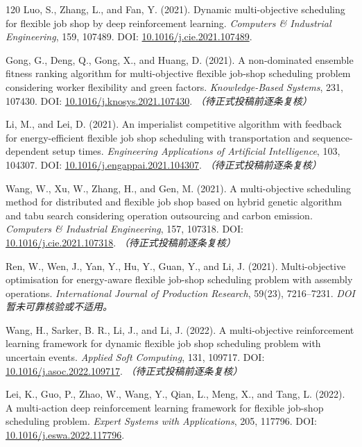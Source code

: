 \documentclass[UTF8,a4paper,11pt]{ctexart}
\begin{document}
\begin{thebibliography}{120}
Luo, S., Zhang, L., and Fan, Y. (2021). Dynamic multi-objective scheduling for flexible job shop by deep reinforcement learning. \emph{Computers \& Industrial Engineering}, 159, 107489.
\newblock DOI: \href{https://doi.org/10.1016/j.cie.2021.107489}{10.1016/j.cie.2021.107489}.

Gong, G., Deng, Q., Gong, X., and Huang, D. (2021). A non-dominated ensemble fitness ranking algorithm for multi-objective flexible job-shop scheduling problem considering worker flexibility and green factors. \emph{Knowledge-Based Systems}, 231, 107430.
\newblock DOI: \href{https://doi.org/10.1016/j.knosys.2021.107430}{10.1016/j.knosys.2021.107430}. \textit{（待正式投稿前逐条复核）}

Li, M., and Lei, D. (2021). An imperialist competitive algorithm with feedback for energy-efficient flexible job shop scheduling with transportation and sequence-dependent setup times. \emph{Engineering Applications of Artificial Intelligence}, 103, 104307.
\newblock DOI: \href{https://doi.org/10.1016/j.engappai.2021.104307}{10.1016/j.engappai.2021.104307}. \textit{（待正式投稿前逐条复核）}

Wang, W., Xu, W., Zhang, H., and Gen, M. (2021). A multi-objective scheduling method for distributed and flexible job shop based on hybrid genetic algorithm and tabu search considering operation outsourcing and carbon emission. \emph{Computers \& Industrial Engineering}, 157, 107318.
\newblock DOI: \href{https://doi.org/10.1016/j.cie.2021.107318}{10.1016/j.cie.2021.107318}. \textit{（待正式投稿前逐条复核）}

Ren, W., Wen, J., Yan, Y., Hu, Y., Guan, Y., and Li, J. (2021). Multi-objective optimisation for energy-aware flexible job-shop scheduling problem with assembly operations. \emph{International Journal of Production Research}, 59(23), 7216--7231.
\newblock \textit{DOI 暂未可靠核验或不适用。}

Wang, H., Sarker, B. R., Li, J., and Li, J. (2022). A multi-objective reinforcement learning framework for dynamic flexible job shop scheduling problem with uncertain events. \emph{Applied Soft Computing}, 131, 109717.
\newblock DOI: \href{https://doi.org/10.1016/j.asoc.2022.109717}{10.1016/j.asoc.2022.109717}. \textit{（待正式投稿前逐条复核）}

Lei, K., Guo, P., Zhao, W., Wang, Y., Qian, L., Meng, X., and Tang, L. (2022). A multi-action deep reinforcement learning framework for flexible job-shop scheduling problem. \emph{Expert Systems with Applications}, 205, 117796.
\newblock DOI: \href{https://doi.org/10.1016/j.eswa.2022.117796}{10.1016/j.eswa.2022.117796}.


\end{thebibliography}
\end{document}
